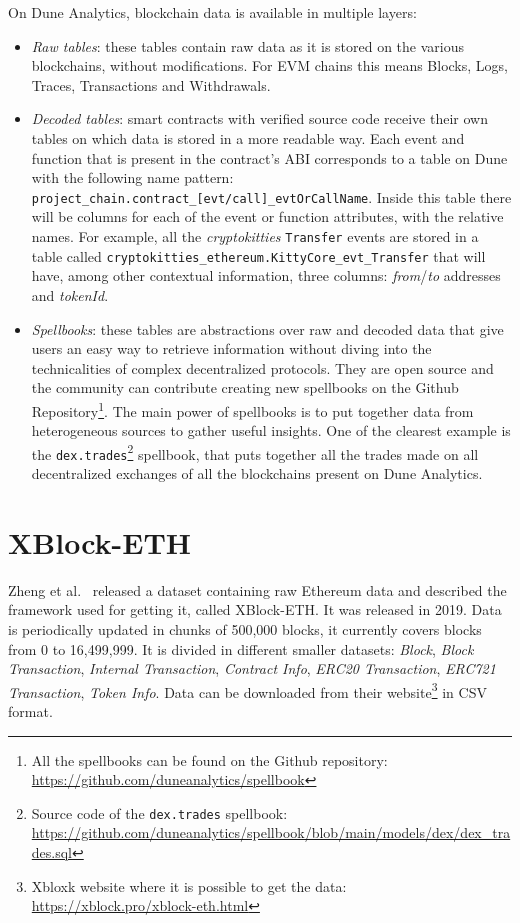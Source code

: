 On Dune Analytics, blockchain data is available in multiple layers:

\begin{itemize}
    \item \textit{Raw tables}: these tables contain raw data as it is stored on the various blockchains, without modifications. For EVM chains this means Blocks, Logs, Traces, Transactions and Withdrawals.
    \item \textit{Decoded tables}: smart contracts with verified source code receive their own tables on which data is stored in a more readable way. Each event and function that is present in the contract's ABI corresponds to a table on Dune with the following name pattern: \texttt{project\_chain.contract\_[evt/call]\_evtOrCallName}. Inside this table there will be columns for each of the event or function attributes, with the relative names. For example, all the \textit{cryptokitties} \texttt{Transfer} events are stored in a table called \texttt{cryptokitties\_ethereum.KittyCore\_evt\_Transfer} that will have, among other contextual information, three columns: \textit{from}/\textit{to} addresses and \textit{tokenId}.
    \item \textit{Spellbooks}: these tables are abstractions over raw and decoded data that give users an easy way to retrieve information without diving into the technicalities of complex decentralized protocols. They are open source and the community can contribute creating new spellbooks on the Github Repository\footnote{All the spellbooks can be found on the Github repository: \url{https://github.com/duneanalytics/spellbook}}. The main power of spellbooks is to put together data from heterogeneous sources to gather useful insights. One of the clearest example is the \texttt{dex.trades}\footnote{Source code of the \texttt{dex.trades} spellbook: \url{https://github.com/duneanalytics/spellbook/blob/main/models/dex/dex\_trades.sql}} spellbook, that puts together all the trades made on all decentralized exchanges of all the blockchains present on Dune Analytics.
\end{itemize}

\section{XBlock-ETH}

Zheng et al.~\cite{xblock-eth} released a dataset containing raw Ethereum data and described the framework used for getting it, called XBlock-ETH. It was released in 2019. Data is periodically updated in chunks of 500,000 blocks, it currently covers blocks from 0 to 16,499,999. It is divided in different smaller datasets: \textit{Block}, \textit{Block Transaction}, \textit{Internal Transaction}, \textit{Contract Info}, \textit{ERC20 Transaction}, \textit{ERC721 Transaction}, \textit{Token Info}. Data can be downloaded from their website\footnote{Xbloxk website where it is possible to get the data: \url{https://xblock.pro/xblock-eth.html}} in CSV format.

